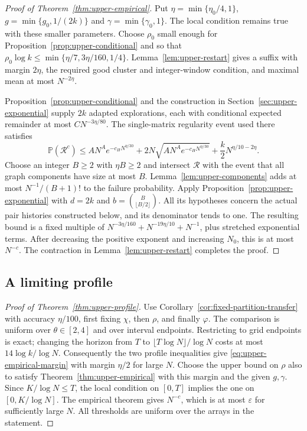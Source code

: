 \documentclass[11pt]{article}
\numberwithin{equation}{section}
\theoremstyle{definition}
\theoremstyle{remark}
\newcommand{\Pp}{\mathbb P}
\newcommand{\1}{\mathbf 1}
\begin{document}

\begin{proof}[Proof of Theorem~\ref{thm:upper-empirical}]
Put $\eta=\min\{\eta_0/4,1\}$,
$g=\min\{g_0,1/(2k)\}$ and $\gamma=\min\{\gamma_0,1\}$.
The local condition remains true with these smaller parameters.
Choose $\rho_0$ small enough for Proposition~\ref{prop:upper-conditional}
and so that $\rho_0\log k\le\min\{\eta/7,3\eta/160,1/4\}$.
Lemma~\ref{lem:upper-restart} gives a suffix with margin $2\eta$,
the required good cluster and integer-window condition, and maximal
mean at most $N^{-2\eta}$.

Proposition~\ref{prop:upper-conditional} and the construction in
Section~\ref{sec:upper-exponential} supply $2k$ adapted explorations,
each with conditional expected remainder at most $CN^{-3\eta/80}$.
The single-matrix regularity event used there satisfies
\[
 \Pp(\mathcal R^c)\le
 AN^A e^{-c_H N^{\eta/30}}
 +2N\sqrt{AN^A e^{-c_H N^{\eta/30}}}
 +\frac{k}{2}N^{\eta/10-2\eta}.
\]
Choose an integer $B\ge2$ with $\eta B\ge2$ and intersect
$\mathcal R$ with the event that all graph components have size at
most $B$. Lemma~\ref{lem:upper-components} adds at most
$N^{-1}/(B+1)!$ to the failure probability. Apply
Proposition~\ref{prop:upper-exponential} with $d=2k$ and
$b=\binom B{\lfloor B/2\rfloor}$. All its hypotheses concern the
actual pair histories constructed below, and its denominator tends
to one. The resulting bound is a fixed multiple of
$N^{-3\eta/160}+N^{-19\eta/10}+N^{-1}$, plus stretched exponential
terms. After decreasing the positive exponent and increasing $N_0$,
this is at most $N^{-c}$. The contraction in
Lemma~\ref{lem:upper-restart} completes the proof.
\end{proof}

\subsection{A limiting profile}

\begin{proof}[Proof of Theorem~\ref{thm:upper-profile}]
Use Corollary~\ref{cor:fixed-partition-transfer} with accuracy
$\eta/100$, first fixing $\chi$, then $\rho$, and finally $\varphi$.
The comparison is uniform over $\theta\in[2,4]$ and over interval
endpoints. Restricting to grid endpoints is exact; changing the
horizon from $T$ to $\lfloor T\log N\rfloor/\log N$ costs at most
$14\log k/\log N$. Consequently the two profile inequalities
give \eqref{eq:upper-empirical-margin} with margin $\eta/2$ for large
$N$. Choose the upper bound on $\rho$ also to satisfy
Theorem~\ref{thm:upper-empirical} with this margin and the given
$g,\gamma$. Since $K/\log N\le T$, the local condition on $[0,T]$
implies the one on $[0,K/\log N]$. The empirical theorem gives
$N^{-c}$, which is at most $\varepsilon$ for sufficiently large $N$.
All thresholds are uniform over the arrays in the statement.
\end{proof}
\end{document}
